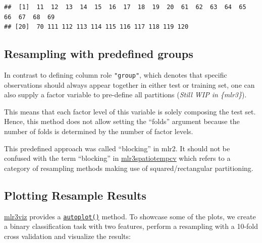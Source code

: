 \documentclass[
]{scrbook}
\newenvironment{Shaded}{\begin{snugshade}}{\end{snugshade}}
\newcommand{\AttributeTok}[1]{\textcolor[rgb]{0.77,0.63,0.00}{#1}}
\newcommand{\CommentTok}[1]{\textcolor[rgb]{0.56,0.35,0.01}{\textit{#1}}}
\newcommand{\ConstantTok}[1]{\textcolor[rgb]{0.00,0.00,0.00}{#1}}
\newcommand{\FunctionTok}[1]{\textcolor[rgb]{0.00,0.00,0.00}{#1}}
\newcommand{\NormalTok}[1]{#1}
\newcommand{\OtherTok}[1]{\textcolor[rgb]{0.56,0.35,0.01}{#1}}
\newcommand{\SpecialCharTok}[1]{\textcolor[rgb]{0.00,0.00,0.00}{#1}}
\newcommand{\StringTok}[1]{\textcolor[rgb]{0.31,0.60,0.02}{#1}}
\renewenvironment{Shaded} {\begin{snugshade}\small} {\end{snugshade}}
\begin{document}
\begin{verbatim}
##  [1]  11  12  13  14  15  16  17  18  19  20  61  62  63  64  65  66  67  68  69
## [20]  70 111 112 113 114 115 116 117 118 119 120
\end{verbatim}

\hypertarget{resampling-with-predefined-groups}{%
\subsection{Resampling with predefined groups}\label{resampling-with-predefined-groups}}

In contrast to defining column role \texttt{"group"}, which denotes that specific observations should always appear together in either test or training set, one can also supply a factor variable to pre-define all partitions (\emph{Still WIP in \{mlr3\}}).

This means that each factor level of this variable is solely composing the test set.
Hence, this method does not allow setting the ``folds'' argument because the number of folds is determined by the number of factor levels.

This predefined approach was called ``blocking'' in mlr2.
It should not be confused with the term ``blocking'' in \href{https://mlr3spatiotempcv.mlr-org.com}{mlr3spatiotempcv} which refers to a category of resampling methods making use of squared/rectangular partitioning.

\hypertarget{autoplot-resampleresult}{%
\subsection{Plotting Resample Results}\label{autoplot-resampleresult}}

\href{https://mlr3viz.mlr-org.com}{mlr3viz} provides a \href{https://www.rdocumentation.org/packages/ggplot2/topics/autoplot}{\texttt{autoplot()}} method.
To showcase some of the plots, we create a binary classification task with two features, perform a resampling with a 10-fold cross validation and visualize the results:

\begin{Shaded}
\end{Shaded}
\end{document}
